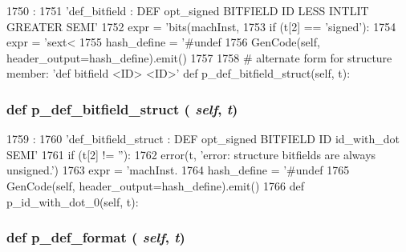 \begin{DoxyCode}
1750                                  :
1751         'def_bitfield : DEF opt_signed BITFIELD ID LESS INTLIT GREATER SEMI'
1752         expr = 'bits(machInst, %
1753         if (t[2] == 'signed'):
1754             expr = 'sext<%
1755         hash_define = '#undef %
1756         GenCode(self, header_output=hash_define).emit()
1757 
1758     # alternate form for structure member: 'def bitfield <ID> <ID>'
    def p_def_bitfield_struct(self, t):
\end{DoxyCode}
\hypertarget{classisa__parser_1_1ISAParser_ab59be3fb9420545e7d3bc02e47af99e9}{
\subsubsection[{p\_\-def\_\-bitfield\_\-struct}]{\setlength{\rightskip}{0pt plus 5cm}def p\_\-def\_\-bitfield\_\-struct ( {\em self}, \/   {\em t})}}
\label{classisa__parser_1_1ISAParser_ab59be3fb9420545e7d3bc02e47af99e9}



\begin{DoxyCode}
1759                                       :
1760         'def_bitfield_struct : DEF opt_signed BITFIELD ID id_with_dot SEMI'
1761         if (t[2] != ''):
1762             error(t, 'error: structure bitfields are always unsigned.')
1763         expr = 'machInst.%
1764         hash_define = '#undef %
1765         GenCode(self, header_output=hash_define).emit()
1766 
    def p_id_with_dot_0(self, t):
\end{DoxyCode}
\hypertarget{classisa__parser_1_1ISAParser_abd4fecf0c2ed51e6ee71e33ff25dacf9}{
\subsubsection[{p\_\-def\_\-format}]{\setlength{\rightskip}{0pt plus 5cm}def p\_\-def\_\-format ( {\em self}, \/   {\em t})}}
\label{classisa__parser_1_1ISAParser_abd4fecf0c2ed51e6ee71e33ff25dacf9}



